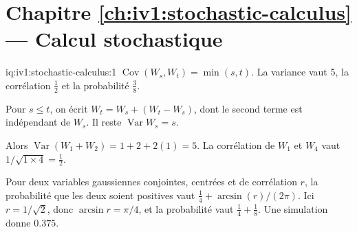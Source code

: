 \section*{Chapitre \ref{ch:iv1:stochastic-calculus} --- Calcul stochastique}

\begin{solution}{iq:iv1:stochastic-calculus:1}
$\operatorname{Cov}(W_s, W_t) = \min(s, t)$. La variance vaut 5, la corrélation $\frac12$ et la probabilité $\frac38$.

Pour $s \le t$, on écrit $W_t = W_s + (W_t - W_s)$, dont le second terme est indépendant de $W_s$. Il reste $\operatorname{Var}W_s = s$.

Alors $\operatorname{Var}(W_1 + W_2) = 1 + 2 + 2(1) = 5$. La corrélation de $W_1$ et $W_4$ vaut $1/\sqrt{1 \times 4} = \frac12$.

Pour deux variables gaussiennes conjointes, centrées et de corrélation $r$, la probabilité que les deux soient positives vaut $\frac14 + \arcsin(r)/(2\pi)$. Ici $r = 1/\sqrt{2}$, donc $\arcsin r = \pi/4$, et la probabilité vaut $\frac14 + \frac18$. Une simulation donne $0.375$.



\end{solution}

